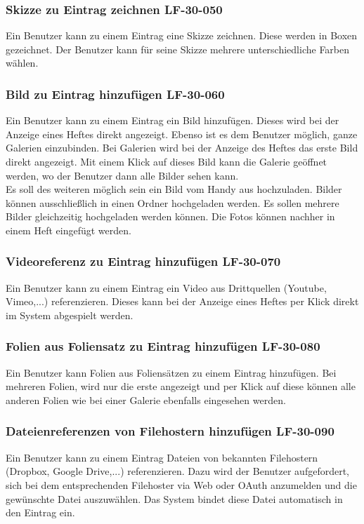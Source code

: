\documentclass[12pt,a4paper,oneside,ngerman]{scrartcl}
\begin{document}
\subsubsection{Skizze zu Eintrag zeichnen \hfill LF-30-050}
Ein Benutzer kann zu einem Eintrag eine Skizze zeichnen. Diese werden in Boxen gezeichnet. Der Benutzer kann für seine Skizze mehrere unterschiedliche Farben wählen.

\subsubsection{Bild zu Eintrag hinzufügen \hfill LF-30-060}
Ein Benutzer kann zu einem Eintrag ein Bild hinzufügen. Dieses wird bei der Anzeige eines Heftes direkt angezeigt. Ebenso ist es dem Benutzer möglich, ganze Galerien einzubinden. Bei Galerien wird bei der Anzeige des Heftes das erste Bild direkt angezeigt. Mit einem Klick auf dieses Bild kann die Galerie geöffnet werden, wo der Benutzer dann alle Bilder sehen kann.\\

Es soll des weiteren möglich sein ein Bild vom Handy aus hochzuladen. Bilder können ausschließlich in einen Ordner hochgeladen werden. Es sollen mehrere Bilder gleichzeitig hochgeladen werden können. Die Fotos können nachher in einem Heft eingefügt werden.

\subsubsection{Videoreferenz zu Eintrag hinzufügen \hfill LF-30-070}
Ein Benutzer kann zu einem Eintrag ein Video aus Drittquellen (Youtube, Vimeo,...)  referenzieren. Dieses kann bei der Anzeige eines Heftes per Klick direkt im System abgespielt werden.

\subsubsection{Folien aus Foliensatz zu Eintrag hinzufügen \hfill LF-30-080}
Ein Benutzer kann Folien aus Foliensätzen zu einem Eintrag hinzufügen. Bei mehreren Folien, wird nur die erste angezeigt und per Klick auf diese können alle anderen Folien wie bei einer Galerie ebenfalls eingesehen werden.

\subsubsection{Dateienreferenzen von Filehostern hinzufügen \hfill LF-30-090}
Ein Benutzer kann zu einem Eintrag Dateien von bekannten Filehostern (Dropbox, Google Drive,...) referenzieren. Dazu wird der Benutzer aufgefordert, sich bei dem entsprechenden Filehoster via Web oder OAuth anzumelden und die gewünschte Datei auszuwählen. Das System bindet diese Datei automatisch in den Eintrag ein.
\end{document}
